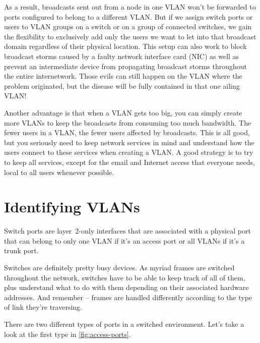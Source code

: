 As a result, broadcasts sent out from a node in one VLAN won't be
forwarded to ports configured to belong to a different VLAN. But if we
assign switch ports or users to VLAN groups on a switch or on a group of
connected switches, we gain the flexibility to exclusively add only the
users we want to let into that broadcast domain regardless of their
physical location. This setup can also work to block broadcast storms
caused by a faulty network interface card (NIC) as well as prevent an
intermediate device from propagating broadcast storms throughout the
entire internetwork. Those evils can still happen on the VLAN where the
problem originated, but the disease will be fully contained in that one
ailing VLAN!

Another advantage is that when a VLAN gets too big, you can simply create more VLANs to keep
the broadcasts from consuming too much bandwidth. The fewer users in a
VLAN, the fewer users affected by broadcasts. This is all good, but you
seriously need to keep network services in mind and understand how the
users connect to these services when creating a VLAN. A good strategy is
to try to keep all services, except for the email and Internet access
that everyone needs, local to all users whenever possible.

\section{Identifying VLANs}

Switch ports are layer~2-only interfaces that are associated with a physical port that can belong to only one VLAN if it's an access port or all VLANs if it's a trunk port.

Switches are definitely pretty busy devices.
As myriad frames are switched throughout the network, switches have to be able to keep track of all of them, plus understand what to do with them depending on their associated hardware addresses.
And remember -- frames are handled differently according to the type of link they're traversing.

There are two different types of ports in a switched environment.
Let's take a look at the first type in \cref{fig:access-ports}.

